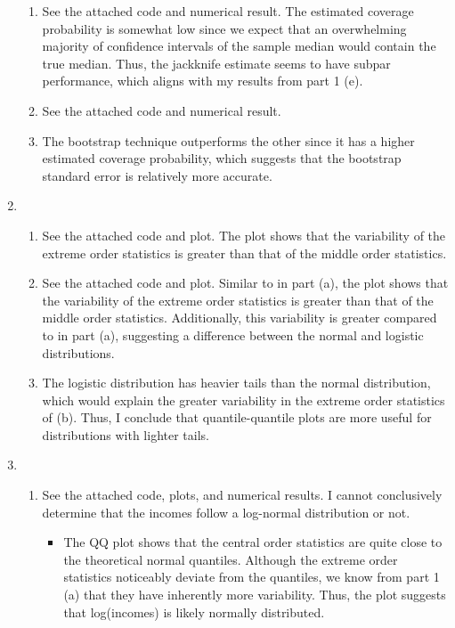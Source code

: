 \documentclass[12pt]{article}
\begin{document}
\begin{enumerate}
    \begin{enumerate}
        \item See the attached code and numerical result. The estimated coverage probability is somewhat low since we expect that an overwhelming majority of confidence intervals of the sample median would contain the true median. Thus, the jackknife estimate seems to have subpar performance, which aligns with my results from part 1 (e).
        \item See the attached code and numerical result.
        \item The bootstrap technique outperforms the other since it has a higher estimated coverage probability, which suggests that the bootstrap standard error is relatively more accurate.
    \end{enumerate}
    \item
    \begin{enumerate}
        \item See the attached code and plot. The plot shows that the variability of the extreme order statistics is greater than that of the middle order statistics.
        \item See the attached code and plot. Similar to in part (a), the plot shows that the variability of the extreme order statistics is greater than that of the middle order statistics. Additionally, this variability is greater compared to in part (a), suggesting a difference between the normal and logistic distributions.
        \item The logistic distribution has heavier tails than the normal distribution, which would explain the greater variability in the extreme order statistics of (b). Thus, I conclude that quantile-quantile plots are more useful for distributions with lighter tails.
    \end{enumerate}
    \item
    \begin{enumerate}
        \item See the attached code, plots, and numerical results. I cannot conclusively determine that the incomes follow a log-normal distribution or not.
        \begin{itemize}
            \item The QQ plot shows that the central order statistics are quite close to the theoretical normal quantiles. Although the extreme order statistics noticeably deviate from the quantiles, we know from part 1 (a) that they have inherently more variability. Thus, the plot suggests that log(incomes) is likely normally distributed.

\end{itemize}
\end{enumerate}
\end{enumerate}
\end{document}
